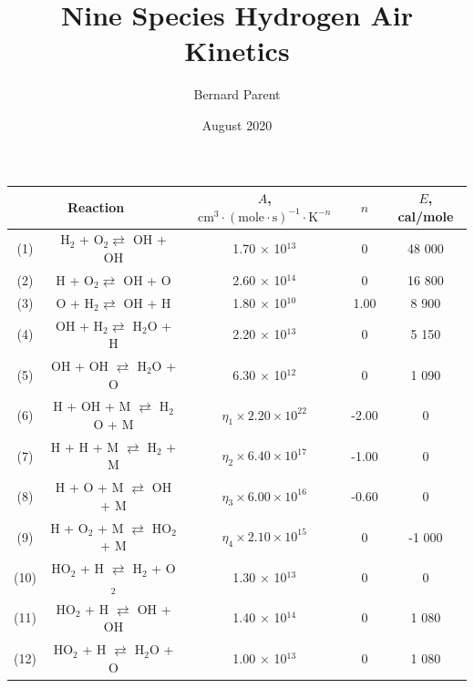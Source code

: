 \documentclass{warpdoc}
\author{
  Bernard Parent 
}
\title{Nine Species Hydrogen Air  Kinetics 
}
\date{
  August 2020
}
\renewcommand{\fontsizetable}{\footnotesize\scalefont{0.9}}
\begin{document}
  \pagestyle{headings}
  \setcounter{page}{1}
  \makewarpdoctitle







%
\begin{table}[t]
\fontsizetable
\begin{center}
\begin{threeparttable}
\begin{tabular}{ccccc} 
\toprule
\multicolumn{2}{c}{Reaction\tnote{a,b}} & $A$, $\textrm{cm}^3\cdot(\textrm{mole}\cdot \textrm{s})^{-1}\cdot \textrm{K}^{-n}$ & $n$ & $E$, cal/mole  \\ 
\midrule
(1) & H$_{2}$ + O$_{2} \rightleftarrows$ OH + OH & 1.70 $\times$ 10$^{13}$ & 0 & 48 000 \\
(2) & H + O$_{2} \rightleftarrows$ OH + O & 2.60 $\times$ 10$^{14}$ & 0 & 16 800 \\
(3) & O + H$_{2} \rightleftarrows$ OH + H & 1.80 $\times$ 10$^{10}$ & 1.00 & 8 900 \\
(4) & OH + H$_{2} \rightleftarrows$ H$_{2}$O + H & 2.20 $\times$ 10$^{13}$ & 0 & 5 150 \\
(5) & OH + OH $\rightleftarrows$ H$_{2}$O + O & 6.30 $\times$ 10$^{12}$ & 0 & 1 090 \\
(6) & H + OH + M $\rightleftarrows$ H$_{2}$O + M & $\eta_1 \times 2.20 \times 10^{22}$ & -2.00 & 0 \\
(7) & H + H + M $\rightleftarrows$ H$_{2}$ + M & $\eta_2 \times 6.40 \times 10^{17}$ & -1.00 & 0 \\
(8) & H + O + M $\rightleftarrows$ OH + M & $\eta_3 \times 6.00 \times 10^{16}$ & -0.60 & 0 \\
(9) & H + O$_{2}$ + M $\rightleftarrows$ HO$_{2}$ + M & $\eta_4 \times 2.10 \times 10^{15}$ & 0 & -1 000 \\
(10) & HO$_{2}$ + H $\rightleftarrows$ H$_{2}$ + O$_{2}$ & 1.30 $\times$ 10$^{13}$ & 0 & 0 \\
(11) & HO$_{2}$ + H $\rightleftarrows$ OH + OH & 1.40 $\times$ 10$^{14}$ & 0 & 1 080 \\
(12) & HO$_{2}$ + H $\rightleftarrows$ H$_{2}$O + O & 1.00 $\times$ 10$^{13}$ & 0 & 1 080 \\

\end{tabular}
\end{threeparttable}
\end{center}
\end{table}
\end{document}
